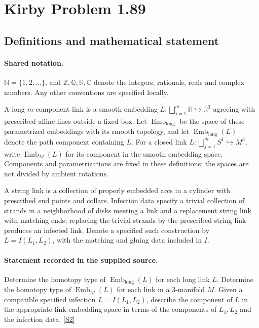 \documentclass[11pt]{article}
\newcommand{\sref}[2]{\hyperlink{source:#1:#2}{[S#2]}}
\begin{document}
\section{Kirby Problem 1.89}\label{statement}

\subsection{Definitions and mathematical statement}

\paragraph{Shared notation.}$\mathbb N=\{1,2,\ldots\}$, and $\mathbb Z,\mathbb Q,\mathbb R,\mathbb C$ denote the integers, rationals, reals and complex numbers. Any other conventions are specified locally.


A long $m$-component link is a smooth embedding $L:\bigsqcup_{j=1}^m\mathbb R\hookrightarrow\mathbb R^3$ agreeing with prescribed affine lines outside a fixed box. Let $\operatorname{Emb}_{\mathrm{long}}$ be the space of these parametrized embeddings with its smooth topology, and let $\operatorname{Emb}_{\mathrm{long}}(L)$ denote the path component containing $L$. For a closed link $L:\bigsqcup_{j=1}^m S^1\hookrightarrow M^3$, write $\operatorname{Emb}_M(L)$ for its component in the smooth embedding space. Components and parametrizations are fixed in these definitions; the spaces are not divided by ambient rotations.

A string link is a collection of properly embedded arcs in a cylinder with prescribed end points and collars. Infection data specify a trivial collection of strands in a neighborhood of disks meeting a link and a replacement string link with matching ends; replacing the trivial strands by the prescribed string link produces an infected link. Denote a specified such construction by $L=I(L_1,L_2)$, with the matching and gluing data included in $I$.
\paragraph{Statement recorded in the supplied source.}
Determine the homotopy type of $\operatorname{Emb}_{\mathrm{long}}(L)$ for each long link $L$. Determine the homotopy type of $\operatorname{Emb}_M(L)$ for each link in a 3-manifold $M$. Given a compatible specified infection $L=I(L_1,L_2)$, describe the component of $L$ in the appropriate link embedding space in terms of the components of $L_1,L_2$ and the infection data. \sref{statement}{2}
\end{document}
